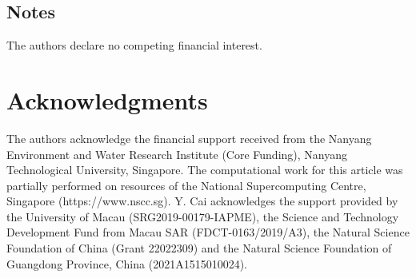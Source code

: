 \documentclass[aps,prl,preprint,11pt,superscriptaddress,bibnotes,amsmath,amssymb,amsfonts,showkeys]{revtex4-2}
\begin{document}
\subsection{Notes}
The authors declare no competing financial interest.

\section{Acknowledgments}
The authors acknowledge the financial support received from the Nanyang Environment and Water Research Institute (Core Funding), Nanyang Technological University, Singapore. The computational work for this article was partially performed on resources of the National Supercomputing Centre, Singapore (https://www.nscc.sg). Y. Cai acknowledges the support provided by the University of Macau (SRG2019-00179-IAPME), the Science and Technology Development Fund from Macau SAR (FDCT-0163/2019/A3), the Natural Science Foundation of China (Grant 22022309) and the Natural Science Foundation of Guangdong Province, China (2021A1515010024).


\end{document}
